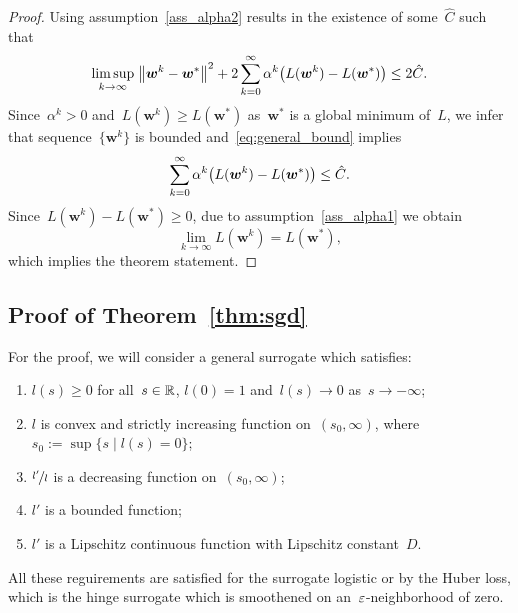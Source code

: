 \begin{proof}
  Using assumption~\ref{ass_alpha2} results in the existence of some~$\hat{C}$ such that
  \begin{equation}\label{eq:general_bound}
  \limsup_{k \rightarrow \infty} \;\norm{\bm{w}^k - \bm{w}^*}^2 + 2\sum_{k=0}^\infty \alpha^k \Brac{L(\bm{w}^k) - L(\bm{w}^*)} \le 2 \hat{C}.
  \end{equation}
  Since~$\alpha^k > 0$ and~$L(\bm{w}^k) \ge L(\bm{w}^*)$ as~$\bm{w}^*$ is a global minimum of~$L$, we infer that sequence~$\{\bm{w}^k\}$ is bounded and~\eqref{eq:general_bound} implies
  \begin{equation*}
    \sum_{k=0}^\infty \alpha^k \Brac{L(\bm{w}^k) - L(\bm{w}^*)} \le \hat{C}.
  \end{equation*}
  Since~$L(\bm{w}^k) - L(\bm{w}^*) \ge 0$, due to assumption~\ref{ass_alpha1} we obtain
  \begin{equation*}
    \lim_{k \to \infty} L(\bm{w}^k) = L(\bm{w}^*),
  \end{equation*}
  which implies the theorem statement.
\end{proof}

\subsection{Proof of Theorem~\ref{thm:sgd}}\label{app:sgd2}

For the proof, we will consider a general surrogate which satisfies:
\begin{enumerate}[label={(S\arabic*)}]
  \item \label{surr_basic1} $l(s)\ge 0$ for all~$s\in\mathbb{R}$, $l(0)=1$ and~$l(s)\to 0$ as~$s\to-\infty$;
  \item \label{surr_basic2} $l$ is convex and strictly increasing function on~$(s_0,\infty)$, where~$s_0:=\sup\{s \mid l(s)=0\}$;
  \item \label{surr_ratio} $\nicefrac{l'}{l}$ is a decreasing function on~$(s_0,\infty)$;
  \item \label{surr_der1} $l'$ is a bounded function;
  \item \label{surr_der2} $l'$ is a Lipschitz continuous function with Lipschitz constant~$D$.
\end{enumerate}
All these reguirements are satisfied for the surrogate logistic or by the Huber loss, which is the hinge surrogate which is smoothened on an~${\varepsilon}$-neighborhood of zero.

